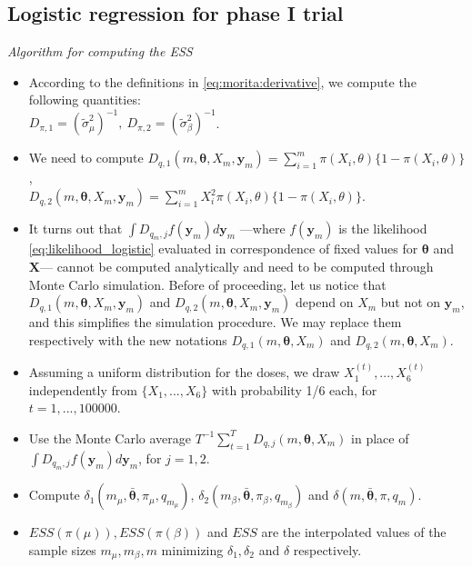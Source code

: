 \documentclass{statsoc}
\begin{document}
\newpage

\subsection*{Logistic regression for phase I trial}
\vspace{0.5cm}

\begin{small}

\textit{Algorithm for computing the ESS} \citep{morita2008determining}
\vspace{0.5cm}

\begin{itemize}
\item According to the definitions in \eqref{eq:morita:derivative}, we compute the following quantities:\\ $D_{\pi,1}=(\tilde{\sigma}^{2}_{\mu})^{-1},\ D_{\pi,2}=(\tilde{\sigma}^{2}_{\beta})^{-1}$.
\item We need to compute $D_{q,1}(m,\bm{\theta}, X_{m}, \bm{y}_{m})=\sum_{i=1}^{m} \pi(X_{i}, \theta)\{ 1-\pi(X_{i}, \theta) \}$,\\ $ D_{q,2}(m,\bm{\theta}, X_{m}, \bm{y}_{m})=\sum_{i=1}^{m}X^{2}_{i} \pi(X_{i}, \theta)\{ 1-\pi(X_{i}, \theta) \} $.
\item  It turns out that $\int D_{q_{m},j}f(\bm{y}_{m})d\bm{y}_{m}$ ---where $f(\bm{y}_{m})$ is the likelihood \eqref{eq:likelihood_logistic} evaluated in correspondence of fixed values for $\bm{\theta}$ and $\bm{X}$--- cannot be computed analytically and need to be computed through Monte Carlo simulation. Before of proceeding, let us notice that $D_{q,1}(m,\bm{\theta}, X_{m}, \bm{y}_{m})$ and $D_{q,2}(m,\bm{\theta}, X_{m}, \bm{y}_{m})$ depend on $X_{m}$ but not on $\bm{y}_{m}$, and this simplifies the simulation procedure. We may replace them respectively with the new notations $D_{q,1}(m,\bm{\theta}, X_{m})$ and $D_{q,2}(m,\bm{\theta}, X_{m})$.
\item Assuming a uniform distribution for the doses, we draw $X^{(t)}_{1},...,X^{(t)}_{6}$ independently from $\{X_{1},...,X_{6} \}$ with probability 1/6 each, for $t=1,...,100000$.
\item Use the Monte Carlo average $T^{-1} \sum_{t=1}^{T}D_{q,j}(m,\bm{\theta}, X_{m})$ in place of $\int D_{q_{m},j}f(\bm{y}_{m})d\bm{y}_{m}$, for $ j=1,2$.
\item  Compute $\delta_{1}(m_{\mu},\bar{\bm{\theta}}, \pi_{\mu}, q_{m_{\mu}})$, $ \delta_{2}(m_{\beta},\bar{\bm{\theta}}, \pi_{\beta}, q_{m_{\beta}})$ and $ \delta(m,\bar{\bm{\theta}}, \pi, q_{m})$.
\item $ ESS(\pi(\mu)), ESS(\pi(\beta))$ and $ESS$ are the interpolated values of the sample sizes $m_{\mu},  m_{\beta},  m$ minimizing $\delta_{1}, \delta_{2}$ and $\delta$ respectively.
\end{itemize}


\end{small}
\end{document}
